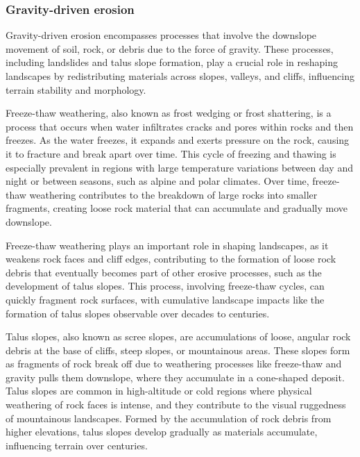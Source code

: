 \subsubsection{Gravity-driven erosion}

Gravity-driven erosion encompasses processes that involve the downslope movement of soil, rock, or debris due to the force of gravity. These processes, including landslides and talus slope formation, play a crucial role in reshaping landscapes by redistributing materials across slopes, valleys, and cliffs, influencing terrain stability and morphology.



Freeze-thaw weathering, also known as frost wedging or frost shattering, is a process that occurs when water infiltrates cracks and pores within rocks and then freezes. As the water freezes, it expands and exerts pressure on the rock, causing it to fracture and break apart over time. This cycle of freezing and thawing is especially prevalent in regions with large temperature variations between day and night or between seasons, such as alpine and polar climates. Over time, freeze-thaw weathering contributes to the breakdown of large rocks into smaller fragments, creating loose rock material that can accumulate and gradually move downslope.

Freeze-thaw weathering plays an important role in shaping landscapes, as it weakens rock faces and cliff edges, contributing to the formation of loose rock debris that eventually becomes part of other erosive processes, such as the development of talus slopes. This process, involving freeze-thaw cycles, can quickly fragment rock surfaces, with cumulative landscape impacts like the formation of talus slopes observable over decades to centuries.


Talus slopes, also known as scree slopes, are accumulations of loose, angular rock debris at the base of cliffs, steep slopes, or mountainous areas. These slopes form as fragments of rock break off due to weathering processes like freeze-thaw and gravity pulls them downslope, where they accumulate in a cone-shaped deposit. Talus slopes are common in high-altitude or cold regions where physical weathering of rock faces is intense, and they contribute to the visual ruggedness of mountainous landscapes. Formed by the accumulation of rock debris from higher elevations, talus slopes develop gradually as materials accumulate, influencing terrain over centuries.

